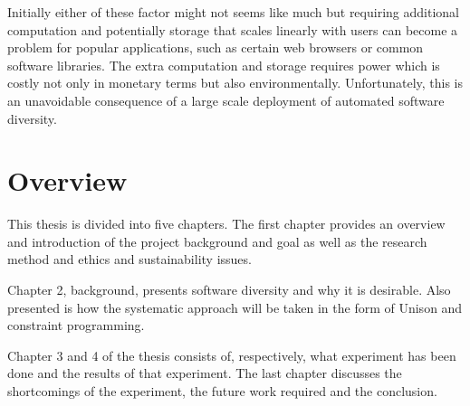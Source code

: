 Initially either of these factor might not seems like much but requiring additional
computation and potentially storage that scales linearly with users can become a problem
for popular applications, such as certain web browsers or common software libraries. The
extra computation and storage requires power which is costly not only in monetary terms
but also environmentally. Unfortunately, this is an unavoidable consequence of a large
scale deployment of automated software diversity.

\section{Overview}

This thesis is divided into five chapters. The first chapter provides an overview and
introduction of the project background and goal as well as the research method and ethics
and sustainability issues.

Chapter 2, background, presents software diversity and why it is desirable. Also presented
is how the systematic approach will be taken in the form of Unison and constraint
programming.

Chapter 3 and 4 of the thesis consists of, respectively, what experiment has
been done and the results of that experiment. The last chapter discusses the shortcomings
of the experiment, the future work required and the conclusion.
